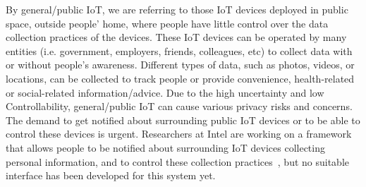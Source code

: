 By general/public IoT, we are referring to those IoT devices deployed in public space, outside people' home, where people have little control over the data collection practices of the devices. These IoT devices can be operated by many entities (i.e. government, employers, friends, colleagues, etc) to collect data with or without people's awareness. Different types of data, such as photos, videos, or locations, can be collected to track people or provide convenience, health-related or social-related information/advice. Due to the high uncertainty and low Controllability, general/public IoT can cause various privacy risks and concerns. The demand to get notified about surrounding public IoT devices or to be able to control these devices is urgent. Researchers at Intel are working on a framework that allows people to be notified about surrounding IoT devices collecting personal information, and to control these collection practices~\cite{chow2015hci}, but no suitable interface has been developed for this system yet.


